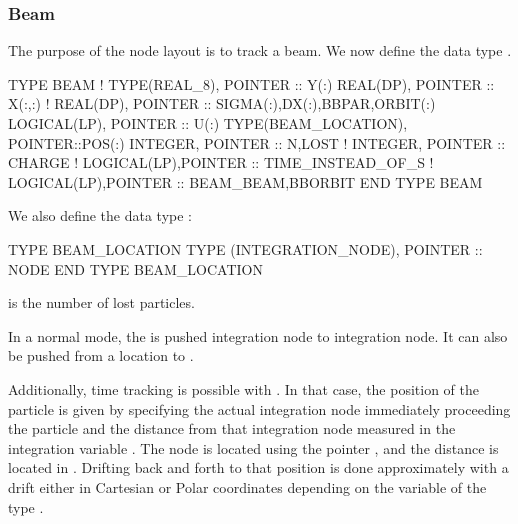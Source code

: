 \subsubsection{Beam}
\label{sub:Beam-B}

The purpose of the node layout is to track a beam. We now define the
data type .

\begin{ptccode}
TYPE BEAM
  !   TYPE(REAL_8), POINTER :: Y(:)
  REAL(DP), POINTER :: X(:,:)
  !   REAL(DP), POINTER :: SIGMA(:),DX(:),BBPAR,ORBIT(:)
  LOGICAL(LP), POINTER :: U(:)
  TYPE(BEAM_LOCATION), POINTER::POS(:)
  INTEGER, POINTER :: N,LOST
  !   INTEGER, POINTER :: CHARGE
  !   LOGICAL(LP),POINTER :: TIME_INSTEAD_OF_S
  !   LOGICAL(LP),POINTER :: BEAM_BEAM,BBORBIT
END TYPE BEAM
\end{ptccode}

We also define the data type :

\begin{ptccode}
TYPE BEAM_LOCATION
  TYPE (INTEGRATION_NODE), POINTER :: NODE
END TYPE BEAM_LOCATION
\end{ptccode}

 is the number of lost particles.

In a normal mode, the  is pushed integration node to
integration node. It can also be pushed from a location  to
.

Additionally, time tracking is possible with .
In that case, the position of the particle is given by specifying the
actual integration node immediately proceeding the particle and the 
distance from that integration node measured in the integration
variable . The node is located using the pointer
, and the distance is located in .
Drifting back and forth to that position is done approximately with
a drift either in Cartesian or Polar coordinates depending on the
variable  of the type .



